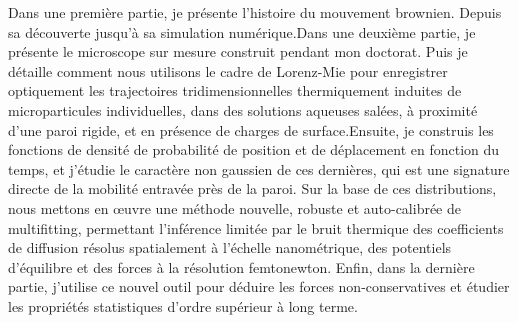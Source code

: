 Dans une première partie, je présente l'histoire du mouvement brownien.  Depuis sa découverte jusqu'à sa simulation numérique.Dans une deuxième partie, je présente le microscope sur mesure construit pendant mon doctorat.  Puis je détaille comment nous utilisons le cadre de Lorenz-Mie pour enregistrer optiquement les trajectoires tridimensionnelles thermiquement induites de microparticules individuelles, dans des solutions aqueuses salées, à proximité d'une paroi rigide, et en présence de charges de surface.Ensuite, je construis les fonctions de densité de probabilité de position et de déplacement en fonction du temps, et j'étudie le caractère non gaussien de ces dernières, qui est une signature directe de la mobilité entravée près de la paroi.  Sur la base de ces distributions, nous mettons en œuvre une méthode nouvelle, robuste et auto-calibrée de multifitting, permettant l'inférence limitée par le bruit thermique des coefficients de diffusion résolus spatialement à l'échelle nanométrique, des potentiels d'équilibre et des forces à la résolution femtonewton. Enfin, dans la dernière partie, j'utilise ce nouvel outil pour déduire les forces non-conservatives et étudier les propriétés statistiques d'ordre supérieur à long terme.


